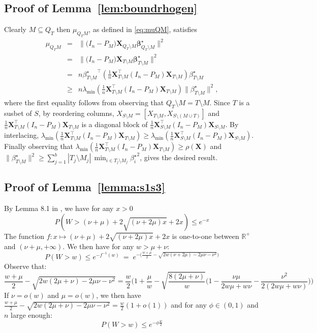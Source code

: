 \documentclass[aos]{imsart}
\theoremstyle{plain}
\newcommand{\R}{\mathbb{R}}
\newcommand{\bs}{\boldsymbol}
\begin{document}
\begin{supplement}
\subsection{Proof of Lemma~\ref{lem:boundrhogen}} 
Clearly $M \subseteq Q_T$ then $\mu_{Q_TM}$, as defined in \eqref{eq:muQM}, satisfies
\begin{eqnarray*}
    \mu_{Q_TM}&=&\|\big(I_n-P_M\big) \bs X_{Q_T\setminus M} \bs \beta^{\star}_{Q_T\setminus M}\|^2\\
    &=&\|\big(I_n-P_M\big) \bs X_{T\setminus M} \bs \beta^{\star}_{T\setminus M}\|^2\\
    &= & n {\beta^{\star}_{T\setminus M}}^\top \left(\tfrac1n \bs X_{T\setminus M}^\top(I_n-P_M)\bs X_{T\setminus M}\right)\beta^{\star}_{T\setminus M}\\
    &\geq & n\lambda_{\min}\left(\tfrac1n \bs X_{T\setminus M}^\top(I_n-P_M)\bs X_{T\setminus M}\right)\|\beta^{\star}_{T\setminus M}\|^2,
\end{eqnarray*}
where the first equality follows from observing that $Q_T\setminus M=T\setminus M$. Since $T$ is a susbet of $S$, by reordering columns, $X_{S\setminus M}=[X_{T\setminus M},X_{S\setminus (M\cup T)}]$ and $\tfrac1n \bs X_{T\setminus M}^\top(I_n-P_M)\bs X_{T\setminus M}$ is a diagonal block of $\tfrac1n \bs X_{S\setminus M}^\top(I_n-P_M)\bs X_{S\setminus M}$. By interlacing, $\lambda_{\min}\left(\tfrac1n \bs X_{T\setminus M}^\top(I_n-P_M)\bs X_{T\setminus M}\right) \geq \lambda_{\min}\left(\tfrac1n \bs X_{S\setminus M}^\top(I_n-P_M)\bs X_{S\setminus M}\right)$. Finally observing that 
$\lambda_{\min}\left(\tfrac1n \bs X_{T\setminus M}^\top(I_n-P_M)\bs X_{T\setminus M}\right) \geq \rho(\bs X)$ and $\|\beta^{\star}_{T\setminus M}\|^2\geq \sum_{j=1}^b|T_j\setminus M_j|\,\min_{i\in T_j\setminus M_j}{\beta_{i}^{\star}}^2$, gives the desired result.

\subsection{Proof of Lemma~\ref{lemma:s1s3}}
By Lemma 8.1 in \cite{birge}, we have for any $x>0$
$$P(W> (\nu+\mu)+2 \sqrt{(\nu+2 \mu) x}+2 x) \leq e^{-x}$$
The function $f:x\mapsto (\nu+\mu)+2 \sqrt{(\nu+2 \mu) x}+2 x$ is  one-to-one between $\R^+$ and $( \nu+
\mu,+\infty)$. We then have  for any $w>\mu+\nu$:
$$P(W > w) \leq e^{-f^{-1}(w)} \:=\; e^{-\big(\frac{w+\mu}{2}  - \sqrt{2w(\nu+2 \mu)-2 \mu \nu - \nu^2 }\big) } $$
Observe that:
$$\frac{w+\mu}{2}  - \sqrt{2w( 2 \mu+ \nu)-2 \mu \nu - \nu^2 }= \frac{w}{2}\bigg(1+\frac{\mu}{w} -\sqrt{\frac{8(2 \mu+\nu)}{w}}\bigg(1-\frac{\nu\mu}{2w\mu+w\nu}-\frac{\nu^2}{2(2w\mu+w\nu)} \bigg)\bigg)$$
 If $\nu=o(w)$ and $\mu=o(w)$, we then have $\frac{w+\mu}{2}  - \sqrt{2w( 2 \mu+ \nu)-2 \mu \nu - \nu^2 }= \frac{w}{2}(1+o(1))$ and for any $\phi\in(0,1)$ and $n$ large enough:
$$P(W > w) \leq  e^{-\phi\frac{w}{2}}$$


\end{supplement}
\end{document}
